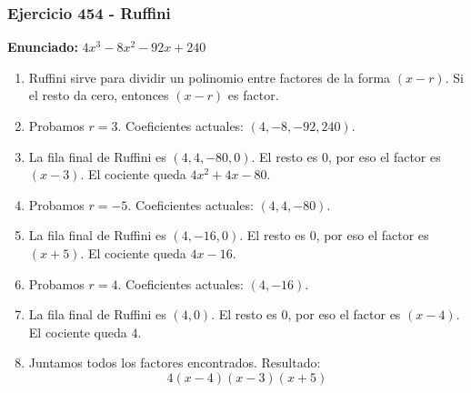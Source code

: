 \documentclass[11pt,a4paper]{article}
\begin{document}
\vspace{0.2cm}
\subsubsection*{Ejercicio 454 - Ruffini}
\textbf{Enunciado:} $ 4 x^{3} - 8 x^{2} - 92 x + 240 $\par
\begin{enumerate}[leftmargin=2em]
\item Ruffini sirve para dividir un polinomio entre factores de la forma \((x-r)\). Si el resto da cero, entonces \((x-r)\) es factor.
\item Probamos \(r=3\). Coeficientes actuales: \((4, -8, -92, 240)\).
\item La fila final de Ruffini es \((4, 4, -80, 0)\). El resto es \(0\), por eso el factor es \((x-3)\). El cociente queda \(4 x^{2} + 4 x - 80\).
\item Probamos \(r=-5\). Coeficientes actuales: \((4, 4, -80)\).
\item La fila final de Ruffini es \((4, -16, 0)\). El resto es \(0\), por eso el factor es \((x+5)\). El cociente queda \(4 x - 16\).
\item Probamos \(r=4\). Coeficientes actuales: \((4, -16)\).
\item La fila final de Ruffini es \((4, 0)\). El resto es \(0\), por eso el factor es \((x-4)\). El cociente queda \(4\).
\item Juntamos todos los factores encontrados. Resultado: \[\boxed{4 \left(x - 4\right) \left(x - 3\right) \left(x + 5\right)}\]
\end{enumerate}

\vspace{0.2cm}
\end{document}
